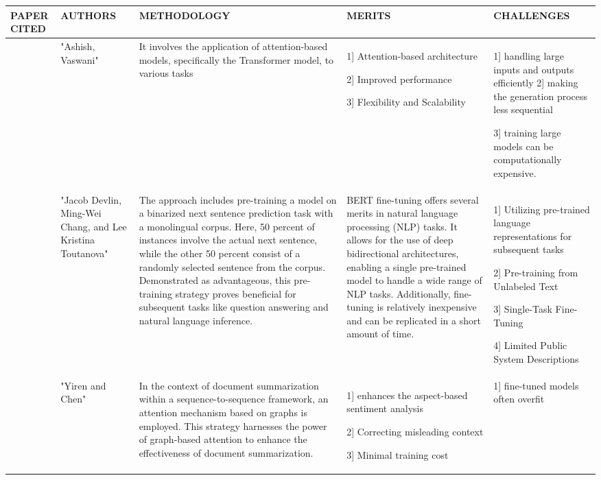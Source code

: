 \documentclass[conference]{IEEEtran}
\begin{document}
\begin{table}
\begin{center}
 \centering
    \begin{tabular}{ |p{1cm}|p{2cm}|p{4cm}|p{4cm}|p{4cm}| }
\hline
\centering PAPER CITED & \centering  AUTHORS & \centering METHODOLOGY &  \centering MERITS &  \centering CHALLENGES \arraybackslash \\ 
\hline
[21]  & "Ashish, Vaswani" & It involves the application of attention-based models, specifically the Transformer model, to various tasks & 1] Attention-based architecture

2]  Improved performance

3] Flexibility and Scalability 
 & 1] handling large inputs and outputs efficiently
2] making the generation process less sequential

3] training large models can be computationally expensive. \\
\hline
[23] & "Jacob Devlin, Ming-Wei Chang, and Lee Kristina Toutanova" & The approach includes pre-training a model on a binarized next sentence prediction task with a monolingual corpus. Here, 50 percent of instances involve the actual next sentence, while the other 50 percent consist of a randomly selected sentence from the corpus. Demonstrated as advantageous, this pre-training strategy proves beneficial for subsequent tasks like question answering and natural language inference.& BERT fine-tuning offers several merits in natural language processing (NLP) tasks. It allows for the use of deep bidirectional architectures, enabling a single pre-trained model to handle a wide range of NLP tasks. Additionally, fine-tuning is relatively inexpensive and can be replicated in a short amount of time. & 1] Utilizing pre-trained language representations for subsequent tasks

2] Pre-training from Unlabeled Text

3] Single-Task Fine-Tuning

4]  Limited Public System Descriptions
 \\
\hline
[24]  & "Yiren and Chen" & In the context of document summarization within a sequence-to-sequence framework, an attention mechanism based on graphs is employed. This strategy harnesses the power of graph-based attention to enhance the effectiveness of document summarization. & 1] enhances the aspect-based sentiment analysis

2] Correcting misleading context

3] Minimal training cost  & 1] fine-tuned models often overfit


\end{tabular}
\end{center}
\end{table}
\end{document}
